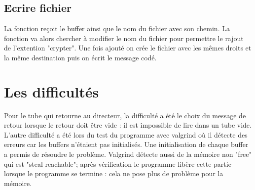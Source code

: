 \documentclass[a4]{article}
\begin{document}
\subsection{Ecrire fichier}
La fonction re\c coit le buffer ainsi que le nom du fichier avec son chemin. La fonction va alors chercher à modifier le nom du fichier pour permettre le rajout de l'extention "crypter". Une fois ajouté on crée le fichier avec les mêmes droits et la même destination puis on écrit le message codé.
\section{Les difficultés}
Pour le tube qui retourne au directeur, la difficulté a été le choix du message de retour lorsque le retour doit être vide : il est impossible de lire dans un tube vide.\newline 
L'autre difficulté a été lors du test du programme avec valgrind où il détecte des erreurs car les buffers n'étaient pas initialisés. Une initialisation de chaque buffer a permis de résoudre le problème. Valgrind détecte aussi de la mémoire non "free" qui est "steal reachable"; après vérification le programme libère cette partie lorsque le programme se termine : cela ne pose plus de problème pour la mémoire.
\end{document}
